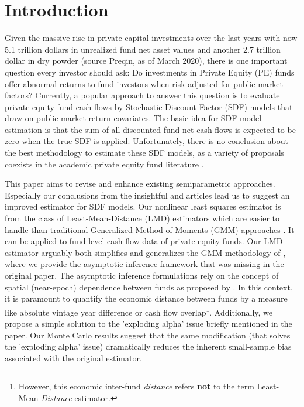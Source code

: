 \documentclass[12pt]{article}
\begin{document}
\section{Introduction}

Given the massive rise in private capital investments over the last years with now 5.1 trillion dollars in unrealized fund net asset values and another 2.7 trillion dollar in dry powder (source Preqin, as of March 2020), there is one important question every investor should ask:
Do investments in Private Equity (PE) funds offer abnormal returns to fund investors when risk-adjusted for public market factors?
Currently, a popular approach to answer this question is to evaluate private equity fund cash flows by Stochastic Discount Factor (SDF) models that draw on public market return covariates.
The basic idea for SDF model estimation is that the sum of all discounted fund net cash flows is expected to be zero when the true SDF is applied.
Unfortunately, there is no conclusion about the best methodology to estimate these SDF models, as a variety of proposals coexists in the academic private equity fund literature \citep{DLP12,B14,KN16,ACGP18,GSW19}.

This paper aims to revise and enhance existing semiparametric approaches.
Especially our conclusions from the insightful \cite{DLP12} and \cite{KN16} articles lead us to suggest an improved estimator for SDF models.
Our nonlinear least squares estimator is from the class of Least-Mean-Distance (LMD) estimators which are easier to handle than traditional Generalized Method of Moments (GMM) approaches \citep{PP97}.
It can be applied to fund-level cash flow data of private equity funds.
Our LMD estimator arguably both simplifies and generalizes the GMM methodology of \cite{DLP12}, where we provide the asymptotic inference framework that was missing in the original paper.
The asymptotic inference formulations rely on the concept of spatial (near-epoch) dependence between funds as proposed by \cite{KN16}.
In this context, it is paramount to quantify the economic distance between funds by a measure like absolute vintage year difference or cash flow overlap\footnote{However, this economic inter-fund \emph{distance} refers \textbf{not} to the term Least-Mean-\emph{Distance} estimator.}.
Additionally, we propose a simple solution to the 'exploding alpha' issue briefly mentioned in the \cite{DLP12} paper.
Our Monte Carlo results suggest that the same modification (that solves the 'exploding alpha' issue) dramatically reduces the inherent small-sample bias associated with the original \cite{DLP12} estimator.
\end{document}
